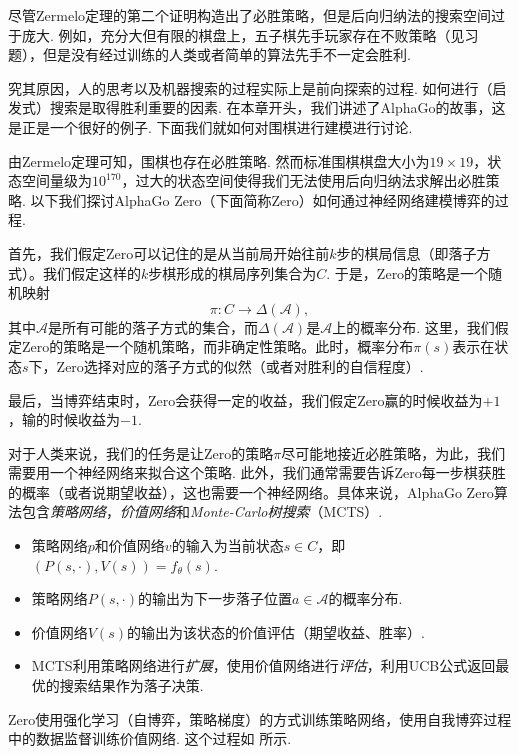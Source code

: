 尽管Zermelo定理的第二个证明构造出了必胜策略，但是后向归纳法的搜索空间过于庞大. 例如，充分大但有限的棋盘上，五子棋先手玩家存在不败策略（见习题），但是没有经过训练的人类或者简单的算法先手不一定会胜利. 

究其原因，人的思考以及机器搜索的过程实际上是前向探索的过程. 如何进行（启发式）搜索是取得胜利重要的因素. 在本章开头，我们讲述了AlphaGo的故事，这是正是一个很好的例子. 下面我们就如何对围棋进行建模进行讨论.

由Zermelo定理可知，围棋也存在必胜策略. 然而标准围棋棋盘大小为$19\times 19$，状态空间量级为$10^{170}$，过大的状态空间使得我们无法使用后向归纳法求解出必胜策略. 以下我们探讨AlphaGo Zero（下面简称Zero）如何通过神经网络建模博弈的过程.

首先，我们假定Zero可以记住的是从当前局开始往前$k$步的棋局信息（即落子方式）。我们假定这样的$k$步棋形成的棋局序列集合为$C$. 于是，Zero的策略是一个随机映射
\[\pi: C\to \Delta(\mathcal A),\]
其中$\mathcal A$是所有可能的落子方式的集合，而$\Delta(\mathcal A)$是$\mathcal A$上的概率分布. 这里，我们假定Zero的策略是一个随机策略，而非确定性策略。此时，概率分布$\pi(s)$表示在状态$s$下，Zero选择对应的落子方式的似然（或者对胜利的自信程度）.

最后，当博弈结束时，Zero会获得一定的收益，我们假定Zero赢的时候收益为$+1$，输的时候收益为$-1$. 

对于人类来说，我们的任务是让Zero的策略$\pi$尽可能地接近必胜策略，为此，我们需要用一个神经网络来拟合这个策略. 此外，我们通常需要告诉Zero每一步棋获胜的概率（或者说期望收益），这也需要一个神经网络。具体来说，AlphaGo Zero算法包含\emph{策略网络}，\emph{价值网络}和\emph{Monte-Carlo树搜索}（MCTS）.
\begin{itemize}
    \item 策略网络$p$和价值网络$v$的输入为当前状态$s\in C$，即$(P(s,\cdot),V(s))=f_\theta(s)$.
    \item 策略网络$P(s,\cdot)$的输出为下一步落子位置$a\in\mathcal A$的概率分布.
    \item 价值网络$V(s)$的输出为该状态的价值评估（期望收益、胜率）.
    \item MCTS利用策略网络进行\emph{扩展}，使用价值网络进行\emph{评估}，利用UCB公式返回最优的搜索结果作为落子决策.
\end{itemize}

Zero使用强化学习（自博弈，策略梯度）的方式训练策略网络，使用自我博弈过程中的数据监督训练价值网络. 这个过程如 所示.

